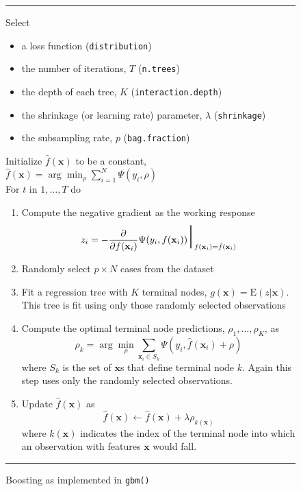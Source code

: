 \documentclass{article}
\newcommand{\EV}{\mathrm{E}}
\newcommand{\aRule}{\begin{center} \rule{5in}{1mm} \end{center}}
\begin{document}
\begin{figure}
\aRule
Select
\begin{itemize}
\item a loss function (\texttt{distribution})
\item the number of iterations, $T$ (\texttt{n.trees})
\item the depth of each tree, $K$ (\texttt{interaction.depth})
\item the shrinkage (or learning rate) parameter, $\lambda$ (\texttt{shrinkage})
\item the subsampling rate, $p$ (\texttt{bag.fraction})
\end{itemize}
Initialize $\hat f(\mathbf{x})$ to be a constant, $\hat f(\mathbf{x}) = \arg \min_{\rho} \sum_{i=1}^N \Psi(y_i,\rho)$ \\
For $t$ in $1,\ldots,T$ do
\begin{enumerate}
\item Compute the negative gradient as the working response
    \begin{equation}
    z_i = -\frac{\partial}{\partial f(\mathbf{x}_i)} \Psi(y_i,f(\mathbf{x}_i)) \mbox{\Huge $|$}_{f(\mathbf{x}_i)=\hat f(\mathbf{x}_i)}
    \end{equation}
\item Randomly select $p\times N$ cases from the dataset
\item Fit a regression tree with $K$ terminal nodes, $g(\mathbf{x})=\EV(z|\mathbf{x})$. This tree is fit using only those randomly selected observations
\item Compute the optimal terminal node predictions, $\rho_1,\ldots,\rho_K$, as
    \begin{equation}
    \rho_k = \arg \min_{\rho} \sum_{\mathbf{x}_i\in S_k} \Psi(y_i,\hat f(\mathbf{x}_i)+\rho)
    \end{equation}
where $S_k$ is the set of $\mathbf{x}$s that define terminal node $k$. Again this step uses only the randomly selected observations.
\item Update $\hat f(\mathbf{x})$ as
    \begin{equation}
    \hat f(\mathbf{x}) \leftarrow \hat f(\mathbf{x}) + \lambda\rho_{k(\mathbf{x})}
    \end{equation}
where $k(\mathbf{x})$ indicates the index of the terminal node into which an observation with features $\mathbf{x}$ would fall.
\end{enumerate}
\aRule
\caption{Boosting as implemented in \texttt{gbm()}}
\label{fig:gbm}
\end{figure}
\end{document}
